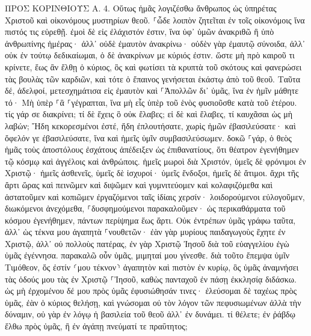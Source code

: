 \documentclass[twoside, 9pt]{extreport}
\begin{document}
ΠΡΟΣ ΚΟΡΙΝΘΙΟΥΣ Α.
4.
Οὕτως ἡμᾶς λογιζέσθω ἄνθρωπος ὡς ὑπηρέτας Χριστοῦ καὶ οἰκονόμους μυστηρίων θεοῦ. 
⸀ὧδε λοιπὸν ζητεῖται ἐν τοῖς οἰκονόμοις ἵνα πιστός τις εὑρεθῇ. 
ἐμοὶ δὲ εἰς ἐλάχιστόν ἐστιν, ἵνα ὑφ᾽ ὑμῶν ἀνακριθῶ ἢ ὑπὸ ἀνθρωπίνης ἡμέρας· ἀλλ᾽ οὐδὲ ἐμαυτὸν ἀνακρίνω· 
οὐδὲν γὰρ ἐμαυτῷ σύνοιδα, ἀλλ᾽ οὐκ ἐν τούτῳ δεδικαίωμαι, ὁ δὲ ἀνακρίνων με κύριός ἐστιν. 
ὥστε μὴ πρὸ καιροῦ τι κρίνετε, ἕως ἂν ἔλθῃ ὁ κύριος, ὃς καὶ φωτίσει τὰ κρυπτὰ τοῦ σκότους καὶ φανερώσει τὰς βουλὰς τῶν καρδιῶν, καὶ τότε ὁ ἔπαινος γενήσεται ἑκάστῳ ἀπὸ τοῦ θεοῦ. 
Ταῦτα δέ, ἀδελφοί, μετεσχημάτισα εἰς ἐμαυτὸν καὶ ⸀Ἀπολλῶν δι᾽ ὑμᾶς, ἵνα ἐν ἡμῖν μάθητε τό· Μὴ ὑπὲρ ⸀ἃ ⸀γέγραπται, ἵνα μὴ εἷς ὑπὲρ τοῦ ἑνὸς φυσιοῦσθε κατὰ τοῦ ἑτέρου. 
τίς γάρ σε διακρίνει; τί δὲ ἔχεις ὃ οὐκ ἔλαβες; εἰ δὲ καὶ ἔλαβες, τί καυχᾶσαι ὡς μὴ λαβών; 
Ἤδη κεκορεσμένοι ἐστέ, ἤδη ἐπλουτήσατε, χωρὶς ἡμῶν ἐβασιλεύσατε· καὶ ὄφελόν γε ἐβασιλεύσατε, ἵνα καὶ ἡμεῖς ὑμῖν συμβασιλεύσωμεν. 
δοκῶ ⸀γάρ, ὁ θεὸς ἡμᾶς τοὺς ἀποστόλους ἐσχάτους ἀπέδειξεν ὡς ἐπιθανατίους, ὅτι θέατρον ἐγενήθημεν τῷ κόσμῳ καὶ ἀγγέλοις καὶ ἀνθρώποις. 
ἡμεῖς μωροὶ διὰ Χριστόν, ὑμεῖς δὲ φρόνιμοι ἐν Χριστῷ· ἡμεῖς ἀσθενεῖς, ὑμεῖς δὲ ἰσχυροί· ὑμεῖς ἔνδοξοι, ἡμεῖς δὲ ἄτιμοι. 
ἄχρι τῆς ἄρτι ὥρας καὶ πεινῶμεν καὶ διψῶμεν καὶ γυμνιτεύομεν καὶ κολαφιζόμεθα καὶ ἀστατοῦμεν 
καὶ κοπιῶμεν ἐργαζόμενοι ταῖς ἰδίαις χερσίν· λοιδορούμενοι εὐλογοῦμεν, διωκόμενοι ἀνεχόμεθα, 
⸀δυσφημούμενοι παρακαλοῦμεν· ὡς περικαθάρματα τοῦ κόσμου ἐγενήθημεν, πάντων περίψημα ἕως ἄρτι. 
Οὐκ ἐντρέπων ὑμᾶς γράφω ταῦτα, ἀλλ᾽ ὡς τέκνα μου ἀγαπητὰ ⸀νουθετῶν· 
ἐὰν γὰρ μυρίους παιδαγωγοὺς ἔχητε ἐν Χριστῷ, ἀλλ᾽ οὐ πολλοὺς πατέρας, ἐν γὰρ Χριστῷ Ἰησοῦ διὰ τοῦ εὐαγγελίου ἐγὼ ὑμᾶς ἐγέννησα. 
παρακαλῶ οὖν ὑμᾶς, μιμηταί μου γίνεσθε. 
διὰ τοῦτο ἔπεμψα ὑμῖν Τιμόθεον, ὅς ἐστίν ⸂μου τέκνον⸃ ἀγαπητὸν καὶ πιστὸν ἐν κυρίῳ, ὃς ὑμᾶς ἀναμνήσει τὰς ὁδούς μου τὰς ἐν Χριστῷ ⸀Ἰησοῦ, καθὼς πανταχοῦ ἐν πάσῃ ἐκκλησίᾳ διδάσκω. 
ὡς μὴ ἐρχομένου δέ μου πρὸς ὑμᾶς ἐφυσιώθησάν τινες· 
ἐλεύσομαι δὲ ταχέως πρὸς ὑμᾶς, ἐὰν ὁ κύριος θελήσῃ, καὶ γνώσομαι οὐ τὸν λόγον τῶν πεφυσιωμένων ἀλλὰ τὴν δύναμιν, 
οὐ γὰρ ἐν λόγῳ ἡ βασιλεία τοῦ θεοῦ ἀλλ᾽ ἐν δυνάμει. 
τί θέλετε; ἐν ῥάβδῳ ἔλθω πρὸς ὑμᾶς, ἢ ἐν ἀγάπῃ πνεύματί τε πραΰτητος; 
\end{document}
